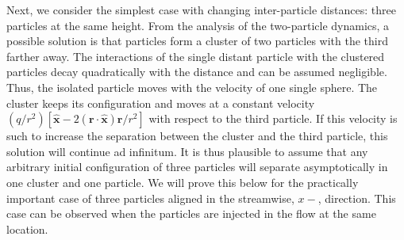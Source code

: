 Next, we consider the simplest case with changing inter-particle distances: three particles at the same height. From the analysis of the two-particle dynamics, a possible solution is that particles form a cluster of two particles with the third farther away.
%
The interactions of the single distant particle with the clustered particles decay quadratically with the distance and can be assumed negligible. Thus, the isolated particle moves with the velocity of one single sphere. The cluster keeps its configuration and moves at a constant velocity $(q/r^2)[\bm {\hat x}\!-\!2 \left(\bm r\cdot\bm {\hat x}\right) \bm r/r^2]$ with respect to the third particle. If this velocity is such to increase the separation between the cluster and the third particle, this solution will continue ad infinitum. It is thus plausible to assume that any arbitrary initial configuration of three particles will separate asymptotically in one cluster and one particle. We will prove this below for the practically important case of three particles aligned in the streamwise, $x-$, direction. This case can be observed when the particles are injected in the flow at the same location.

